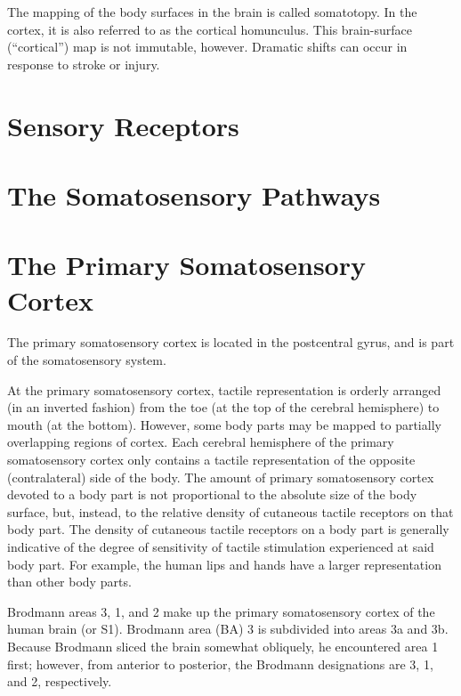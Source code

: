 \documentclass[]{book}
\begin{document}
The mapping of the body surfaces in the brain is called somatotopy. In the cortex, it is also referred to as the cortical homunculus. This brain-surface (``cortical'') map is not immutable, however. Dramatic shifts can occur in response to stroke or injury.

\hypertarget{sensory-receptors}{%
\section{Sensory Receptors}\label{sensory-receptors}}

\hypertarget{the-somatosensory-pathways}{%
\section{The Somatosensory Pathways}\label{the-somatosensory-pathways}}

\hypertarget{the-primary-somatosensory-cortex}{%
\section{The Primary Somatosensory Cortex}\label{the-primary-somatosensory-cortex}}

The primary somatosensory cortex is located in the postcentral gyrus, and is part of the somatosensory system.

At the primary somatosensory cortex, tactile representation is orderly arranged (in an inverted fashion) from the toe (at the top of the cerebral hemisphere) to mouth (at the bottom). However, some body parts may be mapped to partially overlapping regions of cortex. Each cerebral hemisphere of the primary somatosensory cortex only contains a tactile representation of the opposite (contralateral) side of the body. The amount of primary somatosensory cortex devoted to a body part is not proportional to the absolute size of the body surface, but, instead, to the relative density of cutaneous tactile receptors on that body part. The density of cutaneous tactile receptors on a body part is generally indicative of the degree of sensitivity of tactile stimulation experienced at said body part. For example, the human lips and hands have a larger representation than other body parts.

Brodmann areas 3, 1, and 2 make up the primary somatosensory cortex of the human brain (or S1). Brodmann area (BA) 3 is subdivided into areas 3a and 3b. Because Brodmann sliced the brain somewhat obliquely, he encountered area 1 first; however, from anterior to posterior, the Brodmann designations are 3, 1, and 2, respectively.
\end{document}

